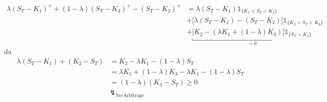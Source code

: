 \begin{enumerate}[(i)]
\begin{equation*}
\begin{aligned}
		\lambda (S_T -K_1)^+ +(1-\lambda)(S_T-K_3)^+-(S_T-K_2)^+
		&= \lambda(S_T-K_1)\mathbb{1}_{\{K_1<S_T<K_2\}} \\
		&+ \big[\lambda(S_T-K_1)-(S_T-K_2)\big]\mathbb{1}_{\{K_2<S_T<K_3\}} \\
		&+ \underbracket{\big[K_2 -(\lambda K_1+(1-\lambda)K_3)\big]\mathbb{1}_{\{S_T>K_3\}}}_{=0}
	\end{aligned}
	\end{equation*}
	da 
	\begin{equation*}
	\begin{aligned}
		\lambda (S_T-K_1)+(K_2-S_T) &= K_2-\lambda K_1-(1-\lambda)S_T \\
		&= \lambda K_1 + (1-\lambda)K_3-\lambda K_1-(1-\lambda)S_T \\
		&= (1-\lambda)(K_3-S_T) \ge 0 \\
		&\lightning_{\text{No-Arbitrage}}
	\end{aligned}
	\end{equation*}
	
\end{enumerate}

